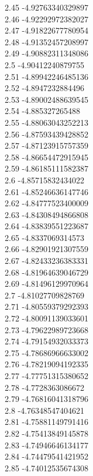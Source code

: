 {2.45	-4.92763340329897\\
2.46	-4.92292972382027\\
2.47	-4.91822677780954\\
2.48	-4.91352457208997\\
2.49	-4.90882311348086\\
2.5	-4.90412240879755\\
2.51	-4.89942246485136\\
2.52	-4.8947232884496\\
2.53	-4.89002488639545\\
2.54	-4.885327265488\\
2.55	-4.88063043252213\\
2.56	-4.87593439428852\\
2.57	-4.87123915757359\\
2.58	-4.86654472915945\\
2.59	-4.86185111582387\\
2.6	-4.85715832434022\\
2.61	-4.85246636147746\\
2.62	-4.84777523400009\\
2.63	-4.84308494866808\\
2.64	-4.83839551223687\\
2.65	-4.8337069314573\\
2.66	-4.82901921307559\\
2.67	-4.82433236383331\\
2.68	-4.81964639046729\\
2.69	-4.81496129970964\\
2.7	-4.81027709828769\\
2.71	-4.80559379292393\\
2.72	-4.80091139033601\\
2.73	-4.79622989723668\\
2.74	-4.79154932033373\\
2.75	-4.78686966633002\\
2.76	-4.78219094192335\\
2.77	-4.77751315380652\\
2.78	-4.7728363086672\\
2.79	-4.76816041318796\\
2.8	-4.76348547404621\\
2.81	-4.75881149791416\\
2.82	-4.75413849145878\\
2.83	-4.74946646134177\\
2.84	-4.74479541421952\\
2.85	-4.74012535674308\\
}
